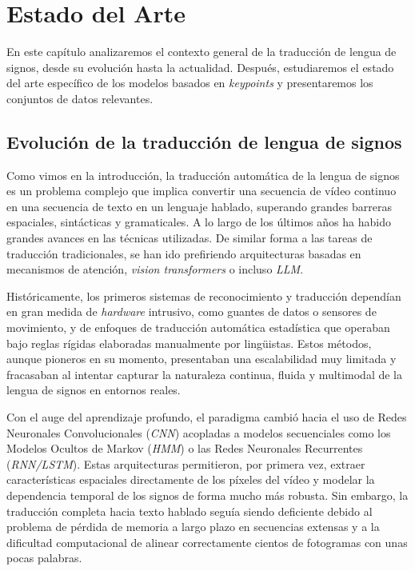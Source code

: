 \chapter{Estado del Arte}\label{ch:sota}
En este capítulo analizaremos el contexto general de la traducción de lengua de signos, desde su evolución hasta la actualidad.
Después, estudiaremos el estado del arte específico de los modelos basados en \textit{keypoints} y presentaremos los conjuntos de datos relevantes.

\section{Evolución de la traducción de lengua de signos}
Como vimos en la introducción, la traducción automática de la lengua de signos es un problema complejo que implica convertir una secuencia de vídeo continuo en una secuencia de texto en un lenguaje hablado, superando grandes barreras espaciales, sintácticas y gramaticales.
A lo largo de los últimos años ha habido grandes avances en las técnicas utilizadas.
De similar forma a las tareas de traducción tradicionales, se han ido prefiriendo arquitecturas basadas en mecanismos de atención, \textit{vision transformers} o incluso \textit{LLM}.

Históricamente, los primeros sistemas de reconocimiento y traducción dependían en gran medida de \textit{hardware} intrusivo, como guantes de datos o sensores de movimiento, y de enfoques de traducción automática estadística que operaban bajo reglas rígidas elaboradas manualmente por lingüistas.
Estos métodos, aunque pioneros en su momento, presentaban una escalabilidad muy limitada y fracasaban al intentar capturar la naturaleza continua, fluida y multimodal de la lengua de signos en entornos reales.

Con el auge del aprendizaje profundo, el paradigma cambió hacia el uso de Redes Neuronales Convolucionales (\textit{CNN}) acopladas a modelos secuenciales como los Modelos Ocultos de Markov (\textit{HMM}) o las Redes Neuronales Recurrentes (\textit{RNN/LSTM}).
Estas arquitecturas permitieron, por primera vez, extraer características espaciales directamente de los píxeles del vídeo y modelar la dependencia temporal de los signos de forma mucho más robusta.
Sin embargo, la traducción completa hacia texto hablado seguía siendo deficiente debido al problema de pérdida de memoria a largo plazo en secuencias extensas y a la dificultad computacional de alinear correctamente cientos de fotogramas con unas pocas palabras.


